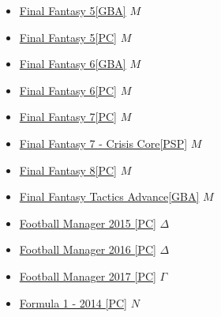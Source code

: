 \begin{itemize}
				\item \href{https://mega.nz/#!pmoBzKTL!onR_UR-z7yBOlppqTxdnLwBg7rHciDO8cyGnviCUEbc} {Final Fantasy 5[GBA]} $M$ \\ 
				\item \href{https://mega.nz/#!AupjgZQa!alwMa2Z05xl1foMB6nZik3rVFpKNJ4vImzCPTkhxJ_E} {Final Fantasy 5[PC]} $M$ \\ 
				\item \href{https://mega.nz/#!gq5DBYAQ!ENRJKoo8f3OUbX3vWiyap2MS9lsv1o7jXyOYkkyYvhs} {Final Fantasy 6[GBA]} $M$ \\ 
				\item \href{https://mega.nz/#!9n4U0TCA!jalkTHO7yMyF9zdNMXFRZ20f6ZSdb9Fi6WoiHgOD5vY} {Final Fantasy 6[PC]} $M$ \\ 
				\item \href{https://mega.nz/#!JyZygBSR!nyNwLrGxuBfQL1C34MKr8V3STwQsV63QY8vcnXl7Sos} {Final Fantasy 7[PC]} $M$ \\ 
				\item \href{https://mega.nz/#!Jm4GDYjC!Hb-4JfbN4WwFIe11VleAaJdQpBdwaXyYSDS8-lNIC64} {Final Fantasy 7 - Crisis Core[PSP]} $M$ \\ 
				\item \href{https://mega.nz/#F!R3gCESBA!Vh7ifgZATmp0JnpbLBoJ-Q} {Final Fantasy 8[PC]} $M$ \\
				\item \href{https://mega.nz/#!0uwSUb6D!IdIZSRBiafmXAsVsN_5OK9_lnkorIGsti0gdSMKANWw} {Final Fantasy Tactics Advance[GBA]} $M$ \\ 
				\item \href{https://mega.nz/#!E2IDEbJb!cpPR3SZmxpWZ5-m8OvS-63nMb1f34e3hMy8nQbfYzbE} {Football Manager 2015 [PC]} $\varDelta$ \\ 
				\item \href{https://mega.nz/#!QnIjgYLJ!VgQ8GnWM2vM8KQspVmpEmt3KZdGh8NtoJ5GWPXU1wbo} {Football Manager 2016 [PC]} $\varDelta$ \\ 
				\item \href{https://mega.nz/#!BnxSQTQK!zPXTghczsnisLJELK7Ydj0XA8ykmDmcJ3LUeUY2jA_k} {Football Manager 2017 [PC]} $\varGamma$ \\ 
				\item \href{https://mega.nz/#F!xTZDEKyC!FA3lE8gN-0zIYE-4k751Uw} {Formula 1 - 2014 [PC]} $N$ \\
				
				
				
				
				
				
				
			\end{itemize}

